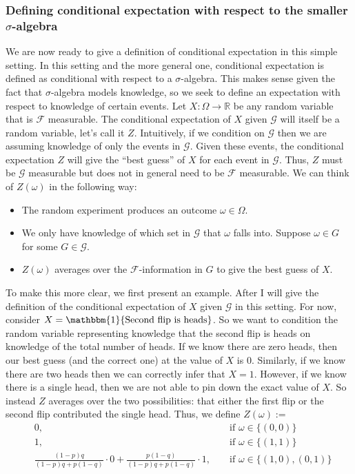 \documentclass[12pt]{article}
\newcommand{\R}{\mathbb{R}}
\begin{document}
\subsubsection{Defining conditional expectation with respect to the smaller $\sigma$-algebra}
We are now ready to give a definition of conditional expectation in this simple setting. In this setting and the more general one, conditional expectation is defined as conditional with respect to a $\sigma$-algebra. This makes sense given the fact that $\sigma$-algebra models knowledge, so we seek to define an expectation with respect to knowledge of certain events. Let $X: \Omega \to \R$ be any random variable that is $\mathcal{F}$ measurable. 
The conditional expectation of $X$ given $\mathcal{G}$ will itself be a random variable, let's call it $Z$. Intuitively, if we condition on $\mathcal{G}$ then we are assuming knowledge of only the events in $\mathcal{G}$. Given 
these events, the conditional expectation $Z$ will give the ``best guess'' of $X$ for each event in $\mathcal{G}$. Thus, $Z$ must be $\mathcal{G}$ measurable but does not in general need to be $\mathcal{F}$ measurable. 
We can think of $Z(\omega)$ in the following way: 
\begin{itemize}
\item The random experiment produces an outcome $\omega \in \Omega$. 
\item We only have knowledge of which set in $\mathcal{G}$ that $\omega$ falls into. Suppose $\omega \in G$ for some $G \in \mathcal{G}$. 
\item $Z(\omega)$ averages over the $\mathcal{F}$-information in $G$ to give the best guess of $X$. 
\end{itemize}
To make this more clear, we first present an example. After I will give the definition of the conditional expectation of $X$ given $\mathcal{G}$ in this setting. For now, consider 
$X = \mathbbm{1}\{\text{Second flip is heads}\}$. So we want to condition the random variable representing knowledge that the second flip is heads on knowledge of the total number of heads.
If we know there are zero heads, then our best guess (and the correct one) at the value of $X$ is $0$. Similarly, if we know there are two heads then we can correctly infer that $X = 1$. However, 
if we know there is a single head, then we are not able to pin down the exact value of $X$. So instead $Z$ averages over the two possibilities: that either the first flip or the second flip contributed the 
single head. Thus, we define $Z(\omega) := $
\begin{align*}
&0, &&\text{ if } \omega \in \{(0, 0)\} \\
&1, &&\text{ if } \omega \in \{(1, 1)\} \\
&\frac{(1 - p)q}{(1 - p)q + p(1 - q)} \cdot 0 + \frac{p(1 - q)}{(1 - p)q + p(1 - q)} \cdot 1, &&\text{ if } \omega \in \{(1, 0), (0, 1)\}
\end{align*}
\end{document}
